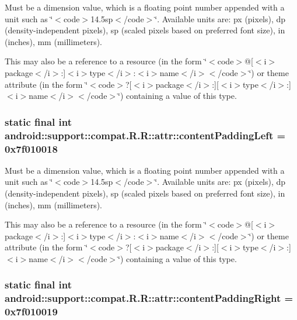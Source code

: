Must be a dimension value, which is a floating point number appended with a unit such as \char`\"{}$<$code$>$14.5sp$<$/code$>$\char`\"{}. Available units are: px (pixels), dp (density-independent pixels), sp (scaled pixels based on preferred font size), in (inches), mm (millimeters). 

This may also be a reference to a resource (in the form \char`\"{}$<$code$>$@\mbox{[}$<$i$>$package$<$/i$>$:\mbox{]}$<$i$>$type$<$/i$>$:$<$i$>$name$<$/i$>$$<$/code$>$\char`\"{}) or theme attribute (in the form \char`\"{}$<$code$>$?\mbox{[}$<$i$>$package$<$/i$>$:\mbox{]}\mbox{[}$<$i$>$type$<$/i$>$:\mbox{]}$<$i$>$name$<$/i$>$$<$/code$>$\char`\"{}) containing a value of this type. \hypertarget{classandroid_1_1support_1_1compat_1_1_r_1_1attr_d3a13a6fc30f45c0757a0832bfdc8d22}{
\subsubsection[{contentPaddingLeft}]{\setlength{\rightskip}{0pt plus 5cm}static final int android::support::compat.R.R::attr::contentPaddingLeft = 0x7f010018}}
\label{classandroid_1_1support_1_1compat_1_1_r_1_1attr_d3a13a6fc30f45c0757a0832bfdc8d22}


Must be a dimension value, which is a floating point number appended with a unit such as \char`\"{}$<$code$>$14.5sp$<$/code$>$\char`\"{}. Available units are: px (pixels), dp (density-independent pixels), sp (scaled pixels based on preferred font size), in (inches), mm (millimeters). 

This may also be a reference to a resource (in the form \char`\"{}$<$code$>$@\mbox{[}$<$i$>$package$<$/i$>$:\mbox{]}$<$i$>$type$<$/i$>$:$<$i$>$name$<$/i$>$$<$/code$>$\char`\"{}) or theme attribute (in the form \char`\"{}$<$code$>$?\mbox{[}$<$i$>$package$<$/i$>$:\mbox{]}\mbox{[}$<$i$>$type$<$/i$>$:\mbox{]}$<$i$>$name$<$/i$>$$<$/code$>$\char`\"{}) containing a value of this type. \hypertarget{classandroid_1_1support_1_1compat_1_1_r_1_1attr_6a8614684ffc2991895b29c1ffaf6983}{
\subsubsection[{contentPaddingRight}]{\setlength{\rightskip}{0pt plus 5cm}static final int android::support::compat.R.R::attr::contentPaddingRight = 0x7f010019}}
\label{classandroid_1_1support_1_1compat_1_1_r_1_1attr_6a8614684ffc2991895b29c1ffaf6983}


